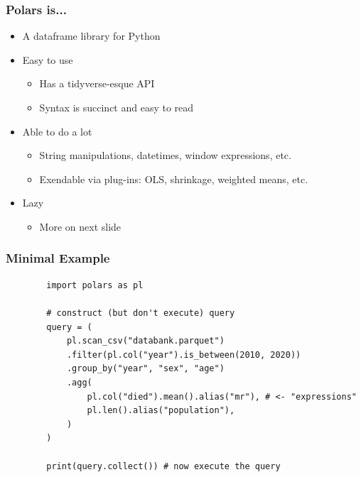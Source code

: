 \documentclass{ali-presentation}
\begin{document}
\begin{frame}
    \frametitle{Polars is...}

    \begin{itemize}
        \item A dataframe library for Python
        \item Easy to use
            \begin{itemize}
                \item Has a tidyverse-esque API
                \item Syntax is succinct and easy to read
            \end{itemize}
        \item Able to do a lot
            \begin{itemize}
                \item String manipulations, datetimes, window expressions, etc.
                \item Exendable via plug-ins: OLS, shrinkage, weighted means, etc.
            \end{itemize}
        \item Lazy 
            \begin{itemize}
                \item More on next slide
            \end{itemize}
    \end{itemize}
\end{frame}


\begin{frame}[fragile]
    \frametitle{Minimal Example}

    \begin{verbatim}
        import polars as pl

        # construct (but don't execute) query
        query = (
            pl.scan_csv("databank.parquet") 
            .filter(pl.col("year").is_between(2010, 2020))
            .group_by("year", "sex", "age")
            .agg(
                pl.col("died").mean().alias("mr"), # <- "expressions"
                pl.len().alias("population"),
            )
        )

        print(query.collect()) # now execute the query
    \end{verbatim}
\end{frame}
\end{document}
